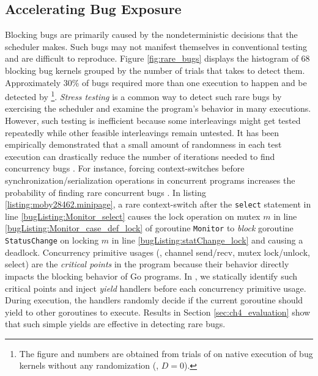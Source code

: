 \subsection{Accelerating Bug Exposure}
Blocking bugs are primarily caused by the nondeterministic decisions that the scheduler makes.
%
Such bugs may not manifest themselves in conventional testing and are difficult to reproduce.
%
Figure \ref{fig:rare_bugs} displays the histogram of 68 blocking bug kernels grouped by the number of trials that \goat takes to detect them.
%
Approximately 30\% of bugs required more than one execution to happen and be detected by \goat\footnote{The figure and numbers are obtained from trials of \goat on native execution of bug kernels without any randomization (\ie, $D=0$).}.
%
\textit{Stress testing} is a common way to detect such rare bugs by exercising the scheduler and examine the program's behavior in many executions.
%
However, such testing is inefficient because some interleavings might get tested repeatedly while other feasible interleavings remain untested.
%
It has been empirically demonstrated that a small amount of randomness in each test execution can drastically reduce the number of iterations needed to find concurrency bugs \cite{thomson-concurrencyTesting-ppopp14,emmi-delayBounded-popl11}.
%
For instance, forcing context-switches before synchronization/serialization operations in concurrent programs increases the probability of finding rare concurrent bugs \cite{burckhardt-depthBug-asplos10}.
%
In listing \ref{listing:moby28462.minipage}, a rare context-switch after the \texttt{select} statement in line \ref{bugListing:Monitor_select} causes the lock operation on mutex $m$ in line \ref{bugListing:Monitor_case_def_lock} of goroutine \texttt{Monitor} to \textit{block} goroutine \texttt{StatusChange} on locking $m$ in line \ref{bugListing:statChange_lock} and causing a deadlock.
%
Concurrency primitive usages (\eg, channel send/recv, mutex lock/unlock, select) are the \textit{critical points} in the program because their behavior directly impacts the blocking behavior of Go programs.
%
In \goat, we statically identify such critical points and inject \textit{yield} handlers before each concurrency primitive usage.
%
During execution, the handlers randomly decide if the current goroutine should yield to other goroutines to execute.
%
Results in Section \ref{sec:ch4_evaluation} show that such simple yields are effective in detecting rare bugs.

